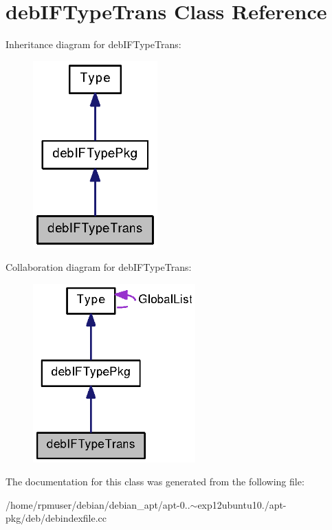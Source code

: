\section{deb\-I\-F\-Type\-Trans \-Class \-Reference}
\label{classdebIFTypeTrans}


\-Inheritance diagram for deb\-I\-F\-Type\-Trans\-:
\nopagebreak
\begin{figure}[H]
\begin{center}
\leavevmode
\includegraphics[width=136pt]{classdebIFTypeTrans__inherit__graph}
\end{center}
\end{figure}


\-Collaboration diagram for deb\-I\-F\-Type\-Trans\-:
\nopagebreak
\begin{figure}[H]
\begin{center}
\leavevmode
\includegraphics[width=177pt]{classdebIFTypeTrans__coll__graph}
\end{center}
\end{figure}


\-The documentation for this class was generated from the following file\-:\begin{DoxyCompactItemize}
\item 
/home/rpmuser/debian/debian\-\_\-apt/apt-\/0..$\sim$exp12ubuntu10./apt-\/pkg/deb/debindexfile.\-cc\end{DoxyCompactItemize}
